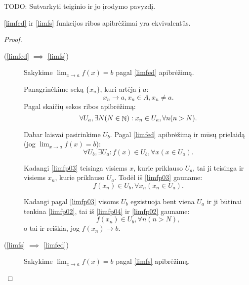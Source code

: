 TODO: Sutvarkyti teiginio ir jo įrodymo pavyzdį.
\begin{prop}
  \ref{limfed} ir \ref{limfs} funkcijos ribos apibrėžimai yra ekvivalentūs.
  \begin{proof}
    \hfill \\
    \begin{description}
      \item[(\ref{limfed} $\implies$ \ref{limfs})] 
        Sakykime $\lim_{x \to a} f(x) = b$ pagal \ref{limfed} apibrėžimą.

        Panagrinėkime seką $\{x_{n}\}$, kuri artėja į $a$:
        \begin{equation}
          x_{n} \to a, x_{n} \in A, x_{n} \neq a.
          \label{limfp01}
        \end{equation}
        Pagal skaičių sekos ribos apibrėžimą:
        \begin{equation}
          \forall U_{a}, \exists N (N \in \NSET) :%
            x_{n} \in U_{a}, \forall n (n > N).
          \label{limfp02}
        \end{equation}

        Dabar laisvai pasirinkime $U_{b}$. Pagal \ref{limfed} apibrėžimą 
        ir mūsų prielaidą (jog $\lim_{x \to a} f(x) = b$):
        \begin{equation}
          \forall U_{b}, \exists U_{a} :%
            f(x) \in U_{b}, \forall x (x \in U_{a}).
          \label{limfp03}
        \end{equation}

        Kadangi \ref{limfp03} teisinga visiems $x$, kurie priklauso $U_{a}$,
        tai ji teisinga ir visiems $x_{n}$, kurie priklauso $U_{a}$. 
        Todėl iš \ref{limfp03} gauname:
        \begin{equation}
          f(x_{n}) \in U_{b}, \forall x_{n} (x_{n} \in U_{a}).
          \label{limfp04}
        \end{equation}

        Kadangi pagal \ref{limfp03} visoms $U_{b}$ egzistuoja bent viena
        $U_{a}$ ir ji būtinai tenkina \ref{limfp02}, tai iš \ref{limfp04}
        ir \ref{limfp02} gauname:
        \begin{equation}
          f(x_{n}) \in U_{b}, \forall n (n > N),
          \label{limfp05}
        \end{equation}
        o tai ir reiškia, jog $f(x_{n}) \to b$.

      \item[(\ref{limfs} $\implies$ \ref{limfed})]
        Sakykime $\lim_{x \to a} f(x) = b$ pagal \ref{limfs} apibrėžimą.


\end{description}
\end{proof}
\end{prop}
